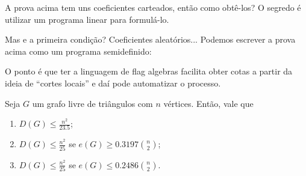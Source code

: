 A prova acima tem uns coeficientes carteados, então como obtê-los?
O segredo é utilizar um programa linear para formulá-lo.


Mas e a primeira condição? Coeficientes aleatórios...
Podemos escrever a prova acima como um programa semidefinido:


O ponto é que ter a linguagem de flag algebras facilita obter cotas a partir da ideia de ``cortes locais'' e daí pode automatizar o processo.

\begin{theorem}
  Seja $G$ um grafo livre de triângulos com $n$ vértices.
  Então, vale que
  \begin{enumerate}
    \item $D(G) \leq \frac{n^2}{23.5}$;
    \item $D(G) \leq \frac{n^2}{25}$ se $e(G) \geq 0.3197 \binom{n}{2}$;
    \item $D(G) \leq \frac{n^2}{25}$ se $e(G) \leq 0.2486 \binom{n}{2}$.
  \end{enumerate}
\end{theorem}
